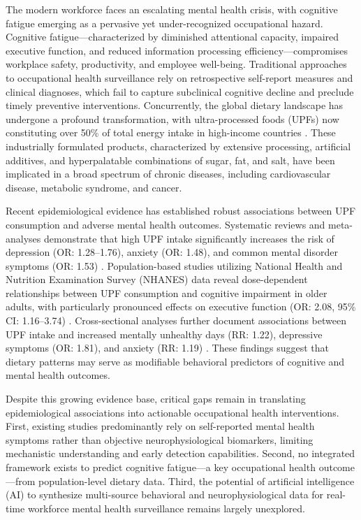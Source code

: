 \documentclass[journal,twoside,10pt]{IEEEtran}
\begin{document}
The modern workforce faces an escalating mental health crisis, with cognitive fatigue emerging as a pervasive yet under-recognized occupational hazard. Cognitive fatigue---characterized by diminished attentional capacity, impaired executive function, and reduced information processing efficiency---compromises workplace safety, productivity, and employee well-being. Traditional approaches to occupational health surveillance rely on retrospective self-report measures and clinical diagnoses, which fail to capture subclinical cognitive decline and preclude timely preventive interventions. Concurrently, the global dietary landscape has undergone a profound transformation, with ultra-processed foods (UPFs) now constituting over 50\% of total energy intake in high-income countries \cite{ref8}. These industrially formulated products, characterized by extensive processing, artificial additives, and hyperpalatable combinations of sugar, fat, and salt, have been implicated in a broad spectrum of chronic diseases, including cardiovascular disease, metabolic syndrome, and cancer.

Recent epidemiological evidence has established robust associations between UPF consumption and adverse mental health outcomes. Systematic reviews and meta-analyses demonstrate that high UPF intake significantly increases the risk of depression (OR: 1.28--1.76), anxiety (OR: 1.48), and common mental disorder symptoms (OR: 1.53) \cite{ref21,ref27,ref29,ref35}. Population-based studies utilizing National Health and Nutrition Examination Survey (NHANES) data reveal dose-dependent relationships between UPF consumption and cognitive impairment in older adults, with particularly pronounced effects on executive function (OR: 2.08, 95\% CI: 1.16--3.74) \cite{ref22}. Cross-sectional analyses further document associations between UPF intake and increased mentally unhealthy days (RR: 1.22), depressive symptoms (OR: 1.81), and anxiety (RR: 1.19) \cite{ref20}. These findings suggest that dietary patterns may serve as modifiable behavioral predictors of cognitive and mental health outcomes.

Despite this growing evidence base, critical gaps remain in translating epidemiological associations into actionable occupational health interventions. First, existing studies predominantly rely on self-reported mental health symptoms rather than objective neurophysiological biomarkers, limiting mechanistic understanding and early detection capabilities. Second, no integrated framework exists to predict cognitive fatigue---a key occupational health outcome---from population-level dietary data. Third, the potential of artificial intelligence (AI) to synthesize multi-source behavioral and neurophysiological data for real-time workforce mental health surveillance remains largely unexplored.
\end{document}
